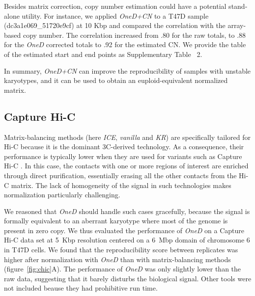 \documentclass[a4,center,fleqn]{NAR}
\begin{document}
Besides matrix correction, copy number estimation could have a potential stand-alone
utility. For instance, we applied \textit{OneD+CN} to a T47D sample
(dc3a1e069\_51720e9cf) at 10 Kbp and compared the correlation with the
array-based copy number. The correlation increased from .80 for the raw totals,
to .88 for the \textit{OneD} corrected totals to .92 for the estimated CN. We
provide the table of the estimated start and end points as Supplementary Table~
2.

In summary, \textit{OneD+CN} can improve the reproducibility of samples
with unstable karyotypes, and it can be used to obtain an
euploid-equivalent normalized matrix.


\subsection{Capture Hi-C}

Matrix-balancing methods (here \textit{ICE}, \textit{vanilla} and
\textit{KR}) are specifically tailored for Hi-C because it is the dominant
3C-derived technology. As a consequence, their performance is typically
lower when they are used for variants such as Capture Hi-C
\citep{jager2015capture}. In this case, the contacts with one or more
regions of interest are enriched through direct purification, essentially
erasing all the other contacts from the Hi-C matrix. The lack of
homogeneity of the signal in such technologies makes normalization
particularly challenging.

We reasoned that \textit{OneD} should handle such cases gracefully,
because the signal is formally equivalent to an aberrant karyotype where
most of the genome is present in zero copy. We thus evaluated the
performance of \textit{OneD} on a Capture Hi-C data set at 5~Kbp
resolution centered on a 6~Mbp domain of chromosome 6 in T47D cells. We
found that the reproducibility score between replicates was higher after
normalization with \textit{OneD} than with matrix-balancing methods
(figure~\ref{fig:chic}A). The performance of \textit{OneD} was only
slightly lower than the raw data, suggesting that it barely disturbs the
biological signal. Other tools were not included beause they had
prohibitive run time.
\end{document}
